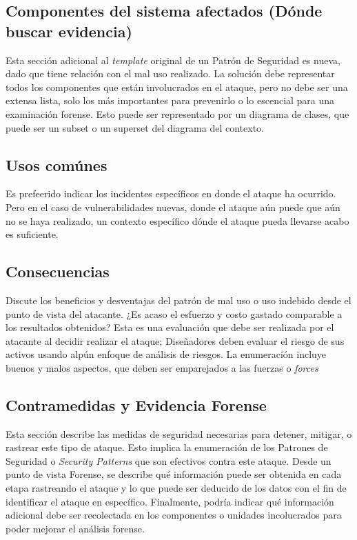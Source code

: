\subsection*{Componentes del sistema afectados (Dónde buscar evidencia)}
Esta sección adicional al \textit{template} original de un Patrón de Seguridad \cite{fernandez2013security} es nueva, dado que tiene relación con el mal uso realizado. La solución debe representar todos los componentes que están involucrados en el ataque, pero no debe ser una extensa lista, solo los más importantes para prevenirlo o lo escencial para una examinación forense. Esto puede ser representado por un diagrama de clases, que puede ser un subset o un superset del diagrama del contexto.

\subsection*{Usos comúnes}
Es prefeerido indicar los incidentes específicos en donde el ataque ha ocurrido. Pero en el caso de vulnerabilidades nuevas, donde el ataque aún puede que aún no se haya realizado, un contexto específico dónde el ataque pueda llevarse acabo es suficiente.

\subsection*{Consecuencias}
Discute los beneficios y desventajas del patrón de mal uso o uso indebido desde el punto de vista del atacante. ¿Es acaso el esfuerzo y costo gastado comparable a los resultados obtenidos? Esta es una evaluación que debe ser realizada por el atacante al decidir realizar el ataque; Diseñadores deben evaluar el riesgo de sus activos usando alpún enfoque de análisis de riesgos. La enumeración incluye buenos y malos aspectos, que deben ser emparejados a las fuerzas o \textit{forces}


\subsection*{Contramedidas y Evidencia Forense}
Esta sección describe las medidas de seguridad necesarias para detener, mitigar, o rastrear este tipo de ataque. Esto implica la enumeración de los Patrones de Seguridad o \textit{Security Patterns} que son efectivos contra este ataque. Desde un punto de vista Forense, se describe qué información puede ser obtenida en cada etapa rastreando el ataque y lo que puede ser deducido de los datos con el fin de identificar el ataque en específico. Finalmente, podría indicar qué información adicional debe ser recolectada en los componentes o unidades incolucrados para poder mejorar el análisis forense.

